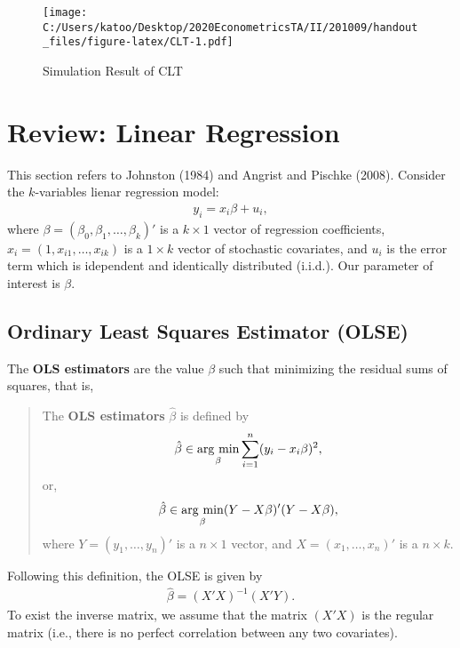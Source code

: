 \documentclass[
  12pt,
]{article}
\begin{document}
\begin{figure}
\centering
\texttt{[image: C:/Users/katoo/Desktop/2020EconometricsTA/II/201009/handout\_files/figure-latex/CLT-1.pdf]}
\caption{Simulation Result of CLT}
\end{figure}

\hypertarget{review-linear-regression}{%
\section{Review: Linear Regression}\label{review-linear-regression}}

This section refers to Johnston (1984) and Angrist and Pischke (2008).
Consider the \(k\)-variables lienar regression model: \begin{align*}
  y_i = x_i \beta + u_i,
\end{align*} where \(\beta = (\beta_0, \beta_1, \ldots, \beta_k)'\) is a
\(k \times 1\) vector of regression coefficients,
\(x_i = (1, x_{i1}, \ldots, x_{ik})\) is a \(1 \times k\) vector of
stochastic covariates, and \(u_i\) is the error term which is idependent
and identically distributed (i.i.d.). Our parameter of interest is
\(\beta\).

\hypertarget{ordinary-least-squares-estimator-olse}{%
\subsection{Ordinary Least Squares Estimator
(OLSE)}\label{ordinary-least-squares-estimator-olse}}

The \textbf{OLS estimators} are the value \(\beta\) such that minimizing
the residual sums of squares, that is,

\begin{quote}
The \textbf{OLS estimators} \(\hat{\beta}\) is defined by \begin{align*}
\hat{\beta} \in \mathop{\rm arg~min}\limits_{\beta} \sum_{i = 1}^n (y_i - x_i \beta)^2,
\end{align*} or, \begin{align*}
\hat{\beta} \in \mathop{\rm arg~min}\limits_{\beta} (Y - X \beta)'(Y - X \beta),
\end{align*} where \(Y = (y_1, \ldots, y_n)'\) is a \(n \times 1\)
vector, and \(X = (x_1, \ldots, x_n)'\) is a \(n \times k\).
\end{quote}

Following this definition, the OLSE is given by \begin{align*}
  \hat{\beta} = (X'X)^{-1}(X'Y).
\end{align*} To exist the inverse matrix, we assume that the matrix
\((X'X)\) is the regular matrix (i.e., there is no perfect correlation
between any two covariates).
\end{document}
